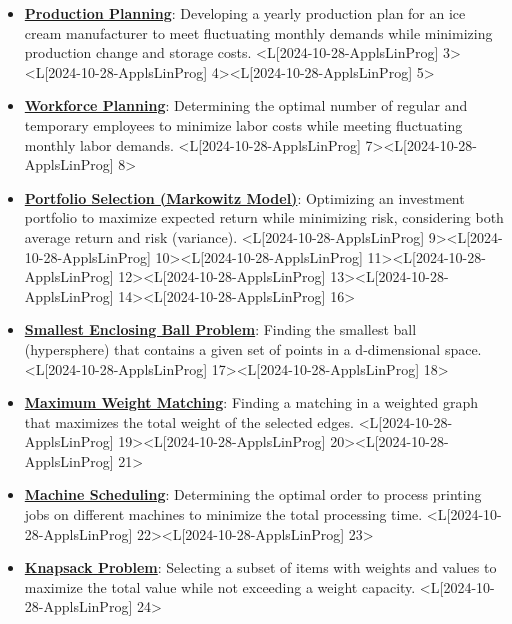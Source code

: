 \documentclass{article}%
\begin{document}
\begin{itemize}[[leftmargin=*]]%
\item \href{https://www.math.purdue.edu/~yipn/421/2024-10-28-ApplsLinProg.pdf#page=3}{\textbf{Production Planning}}: Developing a yearly production plan for an ice cream manufacturer to meet fluctuating monthly demands while minimizing production change and storage costs. <L[2024-10-28-ApplsLinProg] 3><L[2024-10-28-ApplsLinProg] 4><L[2024-10-28-ApplsLinProg] 5>%
\item \href{https://www.math.purdue.edu/~yipn/421/2024-10-28-ApplsLinProg.pdf#page=7}{\textbf{Workforce Planning}}: Determining the optimal number of regular and temporary employees to minimize labor costs while meeting fluctuating monthly labor demands. <L[2024-10-28-ApplsLinProg] 7><L[2024-10-28-ApplsLinProg] 8>%
\item \href{https://www.math.purdue.edu/~yipn/421/2024-10-28-ApplsLinProg.pdf#page=9}{\textbf{Portfolio Selection (Markowitz Model)}}: Optimizing an investment portfolio to maximize expected return while minimizing risk, considering both average return and risk (variance). <L[2024-10-28-ApplsLinProg] 9><L[2024-10-28-ApplsLinProg] 10><L[2024-10-28-ApplsLinProg] 11><L[2024-10-28-ApplsLinProg] 12><L[2024-10-28-ApplsLinProg] 13><L[2024-10-28-ApplsLinProg] 14><L[2024-10-28-ApplsLinProg] 16>%
\item \href{https://www.math.purdue.edu/~yipn/421/2024-10-28-ApplsLinProg.pdf#page=17}{\textbf{Smallest Enclosing Ball Problem}}: Finding the smallest ball (hypersphere) that contains a given set of points in a d-dimensional space. <L[2024-10-28-ApplsLinProg] 17><L[2024-10-28-ApplsLinProg] 18>%
\item \href{https://www.math.purdue.edu/~yipn/421/2024-10-28-ApplsLinProg.pdf#page=19}{\textbf{Maximum Weight Matching}}: Finding a matching in a weighted graph that maximizes the total weight of the selected edges. <L[2024-10-28-ApplsLinProg] 19><L[2024-10-28-ApplsLinProg] 20><L[2024-10-28-ApplsLinProg] 21>%
\item \href{https://www.math.purdue.edu/~yipn/421/2024-10-28-ApplsLinProg.pdf#page=22}{\textbf{Machine Scheduling}}: Determining the optimal order to process printing jobs on different machines to minimize the total processing time. <L[2024-10-28-ApplsLinProg] 22><L[2024-10-28-ApplsLinProg] 23>%
\item \href{https://www.math.purdue.edu/~yipn/421/2024-10-28-ApplsLinProg.pdf#page=24}{\textbf{Knapsack Problem}}: Selecting a subset of items with weights and values to maximize the total value while not exceeding a weight capacity. <L[2024-10-28-ApplsLinProg] 24>%

\end{itemize}
\end{document}
